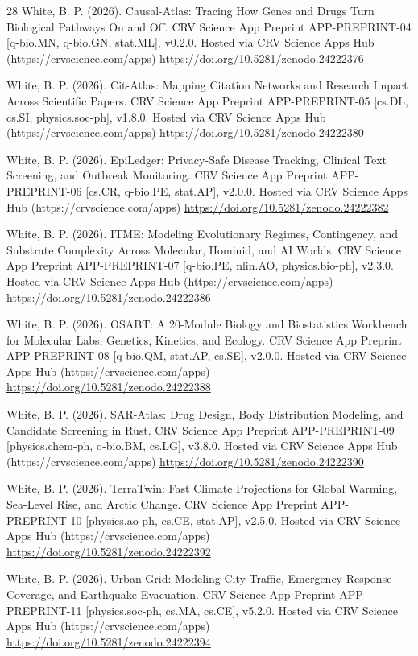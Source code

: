 \documentclass[10pt,letterpaper]{article}
\begin{document}
\begin{thebibliography}{28}
 White, B. P. (2026). Causal-Atlas: Tracing How Genes and Drugs Turn Biological Pathways On and Off. CRV Science App Preprint APP-PREPRINT-04 [q-bio.MN, q-bio.GN, stat.ML], v0.2.0. Hosted via CRV Science Apps Hub (https://crvscience.com/apps) \url{https://doi.org/10.5281/zenodo.24222376}

 White, B. P. (2026). Cit-Atlas: Mapping Citation Networks and Research Impact Across Scientific Papers. CRV Science App Preprint APP-PREPRINT-05 [cs.DL, cs.SI, physics.soc-ph], v1.8.0. Hosted via CRV Science Apps Hub (https://crvscience.com/apps) \url{https://doi.org/10.5281/zenodo.24222380}

 White, B. P. (2026). EpiLedger: Privacy-Safe Disease Tracking, Clinical Text Screening, and Outbreak Monitoring. CRV Science App Preprint APP-PREPRINT-06 [cs.CR, q-bio.PE, stat.AP], v2.0.0. Hosted via CRV Science Apps Hub (https://crvscience.com/apps) \url{https://doi.org/10.5281/zenodo.24222382}

 White, B. P. (2026). ITME: Modeling Evolutionary Regimes, Contingency, and Substrate Complexity Across Molecular, Hominid, and AI Worlds. CRV Science App Preprint APP-PREPRINT-07 [q-bio.PE, nlin.AO, physics.bio-ph], v2.3.0. Hosted via CRV Science Apps Hub (https://crvscience.com/apps) \url{https://doi.org/10.5281/zenodo.24222386}

 White, B. P. (2026). OSABT: A 20-Module Biology and Biostatistics Workbench for Molecular Labs, Genetics, Kinetics, and Ecology. CRV Science App Preprint APP-PREPRINT-08 [q-bio.QM, stat.AP, cs.SE], v2.0.0. Hosted via CRV Science Apps Hub (https://crvscience.com/apps) \url{https://doi.org/10.5281/zenodo.24222388}

 White, B. P. (2026). SAR-Atlas: Drug Design, Body Distribution Modeling, and Candidate Screening in Rust. CRV Science App Preprint APP-PREPRINT-09 [physics.chem-ph, q-bio.BM, cs.LG], v3.8.0. Hosted via CRV Science Apps Hub (https://crvscience.com/apps) \url{https://doi.org/10.5281/zenodo.24222390}

 White, B. P. (2026). TerraTwin: Fast Climate Projections for Global Warming, Sea-Level Rise, and Arctic Change. CRV Science App Preprint APP-PREPRINT-10 [physics.ao-ph, cs.CE, stat.AP], v2.5.0. Hosted via CRV Science Apps Hub (https://crvscience.com/apps) \url{https://doi.org/10.5281/zenodo.24222392}

 White, B. P. (2026). Urban-Grid: Modeling City Traffic, Emergency Response Coverage, and Earthquake Evacuation. CRV Science App Preprint APP-PREPRINT-11 [physics.soc-ph, cs.MA, cs.CE], v5.2.0. Hosted via CRV Science Apps Hub (https://crvscience.com/apps) \url{https://doi.org/10.5281/zenodo.24222394}


\end{thebibliography}
\end{document}
